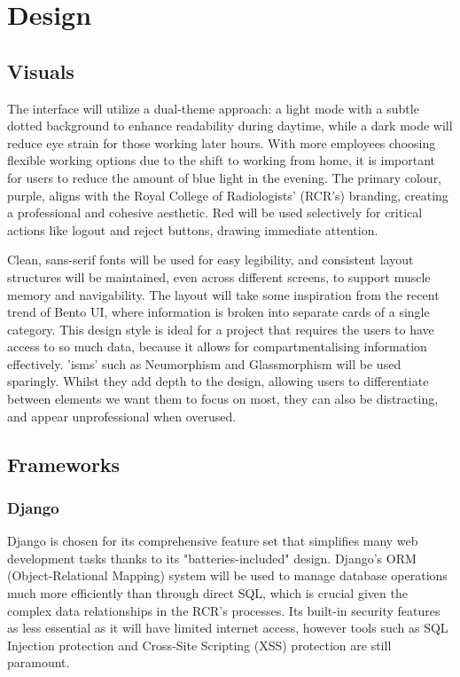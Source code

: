 \chapter{Design}
\section{Visuals}
The interface will utilize a dual-theme approach: a light mode with a subtle dotted background to enhance readability during daytime, while a dark mode will reduce eye strain for those working later hours. With more employees choosing flexible working options due to the shift to working from home, it is important for users to reduce the amount of blue light in the evening. The primary colour, purple, aligns with the Royal College of Radiologists' (RCR’s) branding, creating a professional and cohesive aesthetic. Red will be used selectively for critical actions like logout and reject buttons, drawing immediate attention.

Clean, sans-serif fonts will be used for easy legibility, and consistent layout structures will be maintained, even across different screens, to support muscle memory and navigability. The layout will take some inspiration from the recent trend of Bento UI, where information is broken into separate cards of a single category. This design style is ideal for a project that requires the users to have access to so much data, because it allows for compartmentalising information effectively. 'isms' such as Neumorphism and Glassmorphism will be used sparingly. Whilst they add depth to the design, allowing users to differentiate between elements we want them to focus on most, they can also be distracting, and appear unprofessional when overused. 
\section{Frameworks}
\subsection{Django} \label{Django}
Django is chosen for its comprehensive feature set that simplifies many web development tasks thanks to its "batteries-included" design. Django’s ORM (Object-Relational Mapping) system will be used to manage database operations much more efficiently than through direct SQL, which is crucial given the complex data relationships in the RCR’s processes. Its built-in security features as less essential as it will have limited internet access, however tools such as SQL Injection protection and Cross-Site Scripting (XSS) protection are still paramount.

